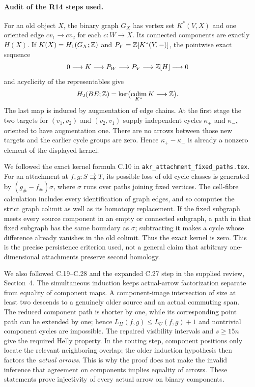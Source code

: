 \paragraph{Audit of the R14 steps used.}
For an old object $X$, the binary graph $G_X$ has vertex set $K^*(V,X)$ and one oriented edge $cv_1\to cv_2$ for each $c:W\to X$. Its connected components are exactly $H(X)$. If $K(X)=H_1(G_X;\mathbb Z)$ and $P_Y=\mathbb Z[K^*(Y,-)]$, the pointwise exact sequence
\[
 0\longrightarrow K\longrightarrow P_W\longrightarrow P_V
   \longrightarrow\mathbb Z[H]\longrightarrow0
\]
and acyclicity of the representables give
\[
 H_2(BE;\mathbb Z)=
 \ker\bigl(\operatorname*{colim}_{K^*}K\longrightarrow\mathbb Z\bigr).
\]
The last map is induced by augmentation of edge chains. At the first stage the two targets for $(v_1,v_2)$ and $(v_2,v_1)$ supply independent cycles $\kappa_+$ and $\kappa_-$, oriented to have augmentation one. There are no arrows between those new targets and the earlier cycle groups are zero. Hence $\kappa_+-\kappa_-$ is already a nonzero element of the displayed kernel.

We followed the exact kernel formula C.10 in \texttt{akr\_attachment\_fixed\_paths.tex}. For an attachment at $f,g:S\rightrightarrows T$, its possible loss of old cycle classes is generated by $(g_\#-f_\#)\sigma$, where $\sigma$ runs over paths joining fixed vertices. The cell-fibre calculation includes every identification of graph edges, and so computes the strict graph colimit as well as its homotopy replacement. If the fixed subgraph meets every source component in an empty or connected subgraph, a path in that fixed subgraph has the same boundary as $\sigma$; subtracting it makes a cycle whose difference already vanishes in the old colimit. Thus the exact kernel is zero. This is the precise persistence criterion used, not a general claim that arbitrary one-dimensional attachments preserve second homology.

We also followed C.19--C.28 and the expanded C.27 step in the supplied review, Section~4. The simultaneous induction keeps actual-arrow factorization separate from equality of component maps. A component-image intersection of size at least two descends to a genuinely older source and an actual commuting span. The reduced component path is shorter by one, while its corresponding point path can be extended by one; hence $L_H(f,g)\leq L_U(f,g)+1$ and nontrivial component cycles are impossible. The repaired visibility intervals and $s\geq15n$ give the required Helly property. In the routing step, component positions only locate the relevant neighboring overlap; the older induction hypothesis then factors the \emph{actual arrows}. This is why the proof does not make the invalid inference that agreement on components implies equality of arrows. These statements prove injectivity of every actual arrow on binary components.

